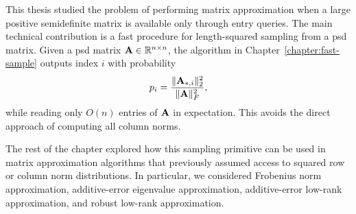 This thesis studied the problem of performing matrix approximation when a large positive semidefinite matrix is available only through entry queries. The main technical contribution is a fast procedure for length-squared sampling from a psd matrix. Given a psd matrix $\mathbf{A}\in\mathbb{R}^{n\times n}$, the algorithm in Chapter~\ref{chapter:fast-sample} outputs index $i$ with probability
\[
    p_i
    =
    \frac{\|\mathbf{A}_{*,i}\|_2^2}{\|\mathbf{A}\|_F^2},
\]
while reading only $O(n)$ entries of $\mathbf{A}$ in expectation. This avoids the direct approach of computing all column norms.

The rest of the chapter explored how this sampling primitive can be used in matrix approximation algorithms that previously assumed access to squared row or column norm distributions. In particular, we considered Frobenius norm approximation, additive-error eigenvalue approximation, additive-error low-rank approximation, and robust low-rank approximation.




